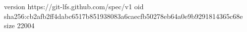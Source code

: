 version https://git-lfs.github.com/spec/v1
oid sha256:cb2afb2ff4dabc6517b851938083a6caecfb50278eb64a0e9b9291814365c68e
size 22004
